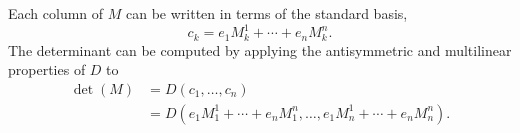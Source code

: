 Each column of \(M\) can be written in terms of the standard basis,
\[
  c_k=e_1M^1_k+\cdots+e_nM^n_k.
\]
The determinant can be computed by applying the antisymmetric and multilinear
properties of \(D\) to
\[
  \begin{aligned}
    \det(M)&=D(c_1,\ldots,c_n)\\
      &=D(e_1M^1_1+\cdots+e_nM^n_1,\ldots,
        e_1M^1_n+\cdots+e_nM^n_n).
  \end{aligned}
\]
